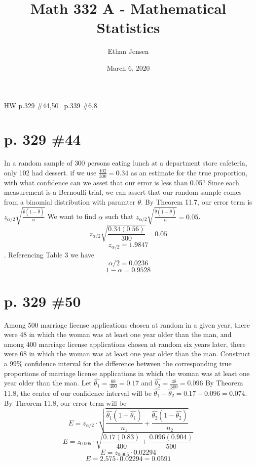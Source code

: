 \documentclass[12pt]{article}
\title{Math 332 A - Mathematical Statistics}
\author{Ethan Jensen}
\date{March 6, 2020}
\begin{document}
	\maketitle HW p.329 \#44,50 \ p.339 \#6,8
  \section[20pt]{p. 329 \#44}
	In a random sample of 300 persons eating lunch at a department store cafeteria, only 102 had dessert. if we use \(\frac{102}{300}=0.34\) as an estimate for the true proportion, with what confidence can we asset that our error is less than 0.05?
	\newline \newline
	Since each measurement is a Bernoulli trial, we can assert that our random sample comes from a binomial distribution with paramter \(\theta\).
	\newline \newline
	By Theorem 11.7, our error term is \(z_{\alpha/2}\sqrt{\frac{\hat{\theta}(1-\hat{\theta})}{n}}\)
	\newline
	We want to find \(\alpha\) such that \(z_{\alpha/2}\sqrt{\frac{\hat{\theta}(1-\hat{\theta})}{n}} = 0.05\).
	\[z_{\alpha/2}\sqrt{\frac{0.34(0.56)}{300}} = 0.05\]
	\[z_{\alpha/2} = 1.9847\].
	\newline
	Referencing Table 3 we have
	\[\alpha/2 = 0.0236\]
	\[1 - \alpha = 0.9528\]
	\newline
	\newpage
	\section[20pt]{p. 329 \#50}
	Among 500 marriage license applications chosen at random in a given year, there were 48 in which the woman was at least one year older than the man, and among 400 marriage license applications chosen at random six years later, there were 68 in which the woman was at least one year older than the man. Construct a 99\% confidence interval for the difference between the corresponding true proportions of marriage license applications in which the woman was at least one year older than the man.
	\newline \newline
	Let \(\hat{\theta_1} = \frac{68}{400} = 0.17\) and \(\hat{\theta_2} = \frac{48}{500} = 0.096\)
	\newline \newline
	By Theorem 11.8, the center of our confidence interval will be \(\hat{\theta_1}-\hat{\theta_2} = 0.17 - 0.096 = 0.074\).
	\newline
	By Theorem 11.8, our error term will be
	\[E = z_{\alpha/2}\cdot \sqrt{\frac{\hat{\theta_1}(1-\hat{\theta_1})}{n_1} + \frac{\hat{\theta_2}(1-\hat{\theta_2})}{n_2}}\]
	\[E = z_{0.005}\cdot \sqrt{\frac{0.17(0.83)}{400} + \frac{0.096(0.904)}{500}}\]
	\[E = z_{0.005}\cdot 0.02294\]
	\[E = 2.575\cdot 0.02294 = 0.0591\]
	\newline
	\newpage
\end{document}
